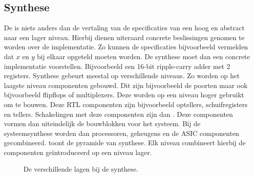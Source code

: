 \subsection{Synthese}
\label{ss:synthese}
De  is niets anders dan de vertaling van de specificaties van een hoog en abstract naar een lager niveau. Hierbij dienen uiteraard concrete beslissingen genomen te worden over de implementatie. Zo kunnen de specificaties bijvoorbeeld vermelden dat $x$ en $y$ bij elkaar opgeteld moeten worden. De synthese moet dan een concrete implementatie voorstellen. Bijvoorbeeld een 16-bit ripple-carry adder met 2 registers. Synthese gebeurt meestal op verschillende niveaus. Zo worden op het laagste niveau componenten gebouwd. Dit zijn bijvoorbeeld de poorten maar ook bijvoorbeeld flipflops of multiplexers. Deze worden op een niveau hoger gebruikt om  te bouwen. Deze RTL componenten zijn bijvoorbeeld optellers, schuifregisters en tellers. Schakelingen met deze componenten zijn dan . Deze componenten vormen dan uiteindelijk de bouwblokken voor het systeem. Bij de systeemsynthese worden dan processoren, geheugens en de ASIC componenten gecombineerd.  toont de pyramide van synthese. Elk niveau combineert hierbij de componenten ge\"introduceerd op een niveau lager.
\begin{figure}[htb]
\centering
{}
\caption{De verschillende lagen bij de synthese.}
\end{figure}
